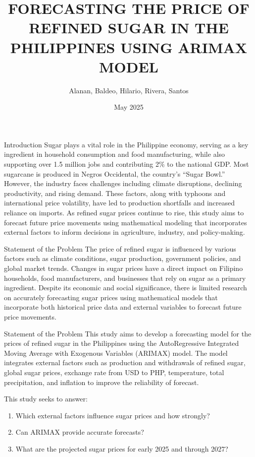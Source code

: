 \documentclass[12pt, aspectratio=169]{beamer}
\title[Forecasting Refined Sugar Prices]{\uppercase{Forecasting the Price of Refined Sugar in the Philippines Using ARIMAX Model}}
\author{Alanan, Baldeo, Hilario, Rivera, Santos}
\institute{Bulacan State University \\ BS Mathematics with Specialization in Computer Science}
\date{May 2025}
\begin{document}
\begin{frame}
  \titlepage
\end{frame}

\begin{frame}{Introduction}
Sugar plays a vital role in the Philippine economy, serving as a key ingredient in household consumption and food manufacturing, while also supporting over 1.5 million jobs and contributing 2\% to the national GDP. Most sugarcane is produced in Negros Occidental, the country's “Sugar Bowl.” However, the industry faces challenges including climate disruptions, declining productivity, and rising demand. These factors, along with typhoons and international price volatility, have led to production shortfalls and increased reliance on imports. As refined sugar prices continue to rise, this study aims to forecast future price movements using mathematical modeling that incorporates external factors to inform decisions in agriculture, industry, and policy-making.
\end{frame}


\begin{frame}{Statement of the Problem}
    The price of refined sugar is influenced by various factors such as climate conditions, sugar production, government policies, and global market trends. Changes in sugar prices have a direct impact on Filipino households, food manufacturers, and businesses that rely on sugar as a primary ingredient. Despite its economic and social significance, there is limited research on accurately forecasting sugar prices using mathematical models that incorporate both historical price data and external variables to forecast future price movements.
\end{frame}

\begin{frame}{Statement of the Problem}
This study aims to develop a forecasting model for the prices of refined sugar in the Philippines using the AutoRegressive Integrated Moving Average with Exogenous Variables (ARIMAX) model. The model integrates external factors such as production and withdrawals of refined sugar, global sugar prices, exchange rate from USD to PHP, temperature, total precipitation, and inflation to improve the reliability of forecast.
\vspace{12pt}

    This study seeks to answer:
    \begin{enumerate}
        \item Which external factors influence sugar prices and how strongly?
        \item Can ARIMAX provide accurate forecasts?
        \item What are the projected sugar prices for early 2025 and through 2027?
    \end{enumerate}

\end{frame}
\end{document}
